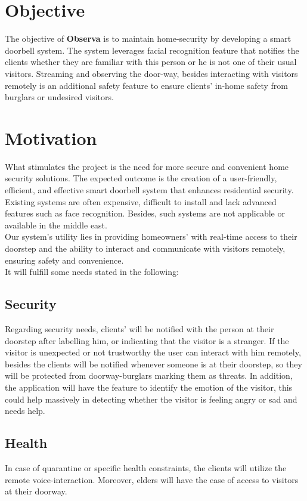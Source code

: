 \documentclass[a4 paper, 12pt]{article}
\begin{document}
\section{Objective}
The objective of \textbf{Observa} is to maintain home-security by developing a smart doorbell system. The system leverages facial recognition feature that notifies the clients whether they are familiar with this person or he is not one of their usual visitors. Streaming and observing the door-way, besides interacting with visitors remotely is an additional safety feature to ensure clients' in-home safety from burglars or undesired visitors.

\section{Motivation}
What stimulates the project is the need for more secure and convenient home security solutions. The expected outcome is the creation of a user-friendly, efficient, and effective smart doorbell system that enhances residential security. Existing systems are often expensive, difficult to install and lack advanced features such as face recognition. Besides, such systems are not applicable or available in the middle east.\\
Our system's utility lies in providing homeowners' with real-time access to their doorstep and the ability to interact and communicate with visitors remotely, ensuring safety and convenience.\\
It will fulfill some needs stated in the following:
\subsection{Security}
Regarding security needs, clients' will be notified with the person at their doorstep after labelling him, or indicating that the visitor is a stranger.
If the visitor is unexpected or not trustworthy the user can interact with him remotely, besides the clients will be notified whenever someone is at their doorstep, so they will be protected from doorway-burglars marking them as threats. In addition, the application will have the feature to identify the emotion of the visitor, this could help massively in detecting whether the visitor is feeling angry or sad and needs help.
\subsection{Health}
In case of quarantine or specific health constraints, the clients will utilize the remote voice-interaction. Moreover, elders will have the ease of access to visitors at their doorway.
\end{document}
